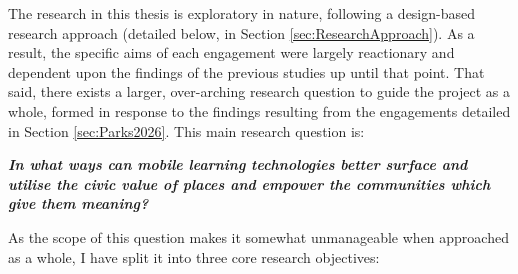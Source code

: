 The research in this thesis is exploratory in nature, following a design-based research approach (detailed below, in Section \ref{sec:ResearchApproach}). As a result, the specific aims of each engagement were largely reactionary and dependent upon the findings of the previous studies up until that point. That said, there exists a larger, over-arching research question to guide the project as a whole, formed in response to the findings resulting from the engagements detailed in Section \ref{sec:Parks2026}. This main research question is:

\begin{displayquote}
\textit{\textbf{In what ways can mobile learning technologies better surface and utilise the civic value of places and empower the communities which give them meaning?}}
\end{displayquote}

As the scope of this question makes it somewhat unmanageable when approached as a whole, I have split it into three core research objectives:

